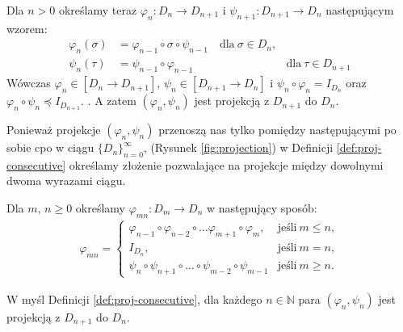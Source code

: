 Dla \(n>0\) określamy teraz \(\varphi_n : D_n \to D_{n+1}\) i \(\psi_{n+1}: D_{n+1}\to D_n\) następującym wzorem:
\begin{align*}
  \varphi_n(\sigma) &= \varphi_{n-1}\circ\sigma\circ\psi_{n-1}\quad \text{dla}\ \sigma\in D_n,\\ 
  \psi_n(\tau) &= \psi_{n-1}\circ\varphi_{n-1}\quad &\text{dla}\ \tau \in D_{n+1}
\end{align*}
Wówczas \(\varphi_n\in[D_n\to D_{n+1}]\), \(\psi_n\in[D_{n+1}\to D_n]\) i \(\psi_n\circ\varphi_n=I_{D_n}\) oraz \(\varphi_n\circ\psi_n\preceq I_{D_{n+1}}.\) \cite[Lemat 16.28]{Hindley:2008:LCI:1388400}. A zatem \((\varphi_n,\psi_n)\) jest projekcją z \(D_{n+1}\) do \(D_n\).

Ponieważ projekcje \((\varphi_n, \psi_n)\) przenoszą nas tylko pomiędzy następującymi po sobie cpo w ciągu \(\{D_n\}_{n=0}^\infty\), (Rysunek \ref{fig:projection}) w Definicji \ref{def:proj-consecutive} określamy złożenie pozwalające na projekcje między dowolnymi dwoma wyrazami ciągu.

\begin{definicja}\label{def:proj-consecutive}%
Dla \(m,\,n\geq 0\) określamy \(\varphi_{mn}:D_m \to D_n\) w następujący sposób:
\begin{align*}
\varphi_{mn} =
\begin{cases}
\varphi_{n-1} \circ \varphi_{n-2} \circ \dots \varphi_{m+1} \circ \varphi_m, & \text{jeśli}\ m\leq n,\\
I_{D_n}, & \text{jeśli}\ m=n,\\
\psi_n \circ \psi_{n+1} \circ \dots \circ \psi_{m-2}\circ \psi_{m-1} & \text{jeśli}\ m\geq n.
\end{cases}
\end{align*}
\end{definicja}

W myśl Definicji \ref{def:proj-consecutive}, dla każdego \(n\in \mathbb{N}\) para \((\varphi_n, \psi_n)\) jest projekcją z \(D_{n+1}\) do \(D_n\).


